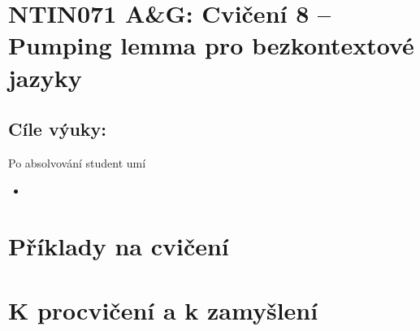 \documentclass[a4paper,12pt]{amsart}
\begin{document}
\thispagestyle{empty}

\section*{NTIN071 A\&G: Cvičení 8 -- Pumping lemma pro bezkontextové jazyky}

\medskip

\subsection*{Cíle výuky:} Po absolvování student umí

\begin{itemize}\setlength{\itemsep}{0pt}
    \item 
\end{itemize}

\section*{Příklady na cvičení}

\medskip\begin{problem} 

\end{problem}


\section*{K procvičení a k zamyšlení}


\medskip\begin{problem}

\end{problem}
\end{document}
